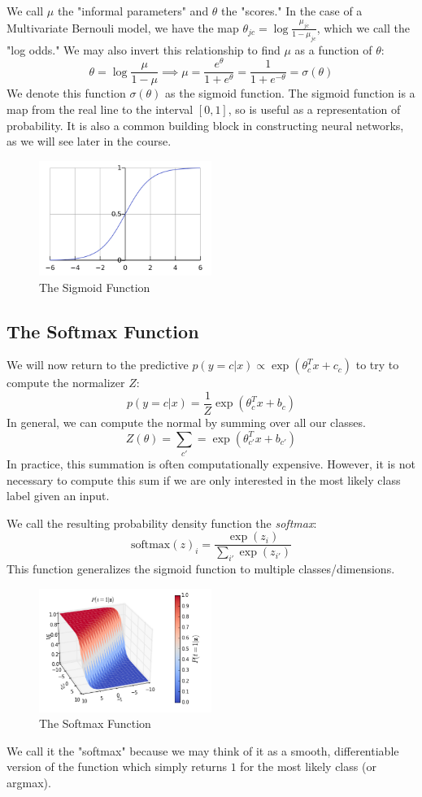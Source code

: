 \documentclass{article}
\begin{document}
We call $\mu$ the "informal parameters" and $\theta$ the "scores." In the case of a Multivariate Bernouli model, we have the map $\theta_{jc} =  \log \frac{\mu_{jc}}{1-\mu_{jc}}$, which we call the "log odds."
We may also invert this relationship to find $\mu$ as a function of $\theta$: 
$$ \theta = \log \frac{\mu}{1-\mu} \implies \mu = \frac{e^{\theta}}{1 + e^{\theta}} = \frac{1}{1 + e^{-\theta}} = \sigma(\theta) $$
We denote this function $\sigma(\theta)$ as the sigmoid function. The sigmoid function is a map from the real line to the interval $[0,1]$, so is useful as a representation of probability. It is also a common building block in constructing neural networks, as we will see later in the course. 
\begin{figure}
\centering
\includegraphics[width=0.5\textwidth]{./sigmoid.png}
\caption{The Sigmoid Function}
\end{figure}
\subsection{The Softmax Function}
We will now return to the predictive $p(y = c | x) \propto \exp(\theta_c^T x + c_c)$ to try to compute the normalizer $Z$: 
$$ p(y=c|x) = \frac{1}{Z} \exp(\theta_c^T x + b_c) $$
In general, we can compute the normal by summing over all our classes.
$$ Z(\theta) = \sum_{c'} = \exp(\theta_{c'}^T x + b_{c'}) $$
In practice, this summation is often computationally expensive. However, it is not necessary to compute this sum if we are only interested in the most likely class label given an input.

\smallskip

We call the resulting probability density function the \emph{softmax}: 
$$ \text{softmax}(z)_i = \frac{ \exp(z_i) }{ \sum_{i'} \exp(z_{i'})} $$
This function generalizes the sigmoid function to multiple classes/dimensions. 
\begin{figure}
\centering
\includegraphics[width=0.5\textwidth]{./softmax.png}
\caption{The Softmax Function}
\end{figure}
We call it the "softmax" because we may think of it as a smooth, differentiable version of the function which simply returns $1$ for the most likely class (or argmax). 
\end{document}
